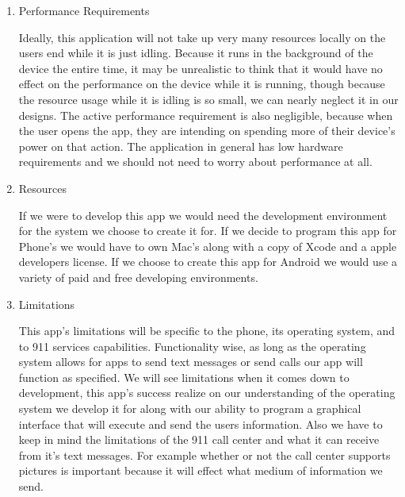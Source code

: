 \documentclass[12pt]{article}
\begin{document}
\begin{enumerate}
\item Performance Requirements

Ideally, this application will not take up very many resources locally on the users end while it is just idling. Because it runs in the background of the device the entire time, it may be unrealistic to think that it would have no effect on the performance on the device while it is running, though because the resource usage while it is idling is so small, we can nearly neglect it in our designs. The active performance requirement is also negligible, because when the user opens the app, they are intending on spending more of their device’s power on that action. The application in general has low hardware requirements and we should not need to worry about performance at all.

\item Resources

If we were to develop this app we would need the development environment for the system we choose to create it for. If we decide to program this app for Phone's we would have to own Mac’s along with a copy of Xcode and a apple developers license. If we choose to create this app for Android we would use a variety of paid and free developing environments.

\item Limitations

This app’s limitations will be specific to the phone, its operating system, and to 911 services capabilities. Functionality wise, as long as the operating system allows for apps to send text messages or send calls our app will function as specified. We will see limitations when it comes down to development, this app’s success realize on our understanding of the operating system we develop it for along with our ability to program a graphical interface that will execute and send the users information. Also we have to keep in mind the limitations of the 911 call center and what it can receive from it's text messages. For example whether or not the call center supports pictures is important because it will effect what medium of information we send.


\end{enumerate}



 
\end{document}
